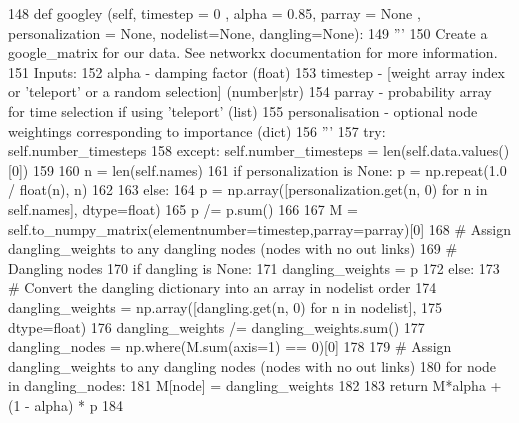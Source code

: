 \begin{DoxyCode}
148       \textcolor{keyword}{def }googley (self, timestep = 0 , alpha = 0.85, parray = None , personalization = None, 
      nodelist=None, dangling=None):
149             \textcolor{stringliteral}{''' }
150 \textcolor{stringliteral}{            Create a google\_matrix for our data. See networkx documentation for more information. }
151 \textcolor{stringliteral}{              Inputs: }
152 \textcolor{stringliteral}{                alpha - damping factor (float)}
153 \textcolor{stringliteral}{                timestep - [weight array index or 'teleport' or a random selection] (number|str)}
154 \textcolor{stringliteral}{                parray - probability array for time selection if using 'teleport' (list)}
155 \textcolor{stringliteral}{                personalisation - optional node weightings corresponding to importance (dict)}
156 \textcolor{stringliteral}{                '''}
157             \textcolor{keywordflow}{try}: self.number\_timesteps
158             \textcolor{keywordflow}{except}: self.number\_timesteps = len(self.data.values()[0])
159                
160             n = len(self.names)
161             \textcolor{keywordflow}{if} personalization \textcolor{keywordflow}{is} \textcolor{keywordtype}{None}:  p = np.repeat(1.0 / float(n), n)
162             
163             \textcolor{keywordflow}{else}:
164                   p = np.array([personalization.get(n, 0) \textcolor{keywordflow}{for} n \textcolor{keywordflow}{in} self.names], dtype=float)
165                   p /= p.sum()
166             
167             M = self.to\_numpy\_matrix(elementnumber=timestep,parray=parray)[0]
168             \textcolor{comment}{# Assign dangling\_weights to any dangling nodes (nodes with no out links)}
169             \textcolor{comment}{# Dangling nodes}
170             \textcolor{keywordflow}{if} dangling \textcolor{keywordflow}{is} \textcolor{keywordtype}{None}:
171                 dangling\_weights = p
172             \textcolor{keywordflow}{else}:
173                 \textcolor{comment}{# Convert the dangling dictionary into an array in nodelist order}
174                 dangling\_weights = np.array([dangling.get(n, 0) \textcolor{keywordflow}{for} n \textcolor{keywordflow}{in} nodelist],
175                                             dtype=float)
176                 dangling\_weights /= dangling\_weights.sum()
177             dangling\_nodes = np.where(M.sum(axis=1) == 0)[0]
178 
179             \textcolor{comment}{# Assign dangling\_weights to any dangling nodes (nodes with no out links)}
180             \textcolor{keywordflow}{for} node \textcolor{keywordflow}{in} dangling\_nodes:
181                 M[node] = dangling\_weights
182                 
183             \textcolor{keywordflow}{return} M*alpha + (1 - alpha) * p
184 
\end{DoxyCode}
\mbox{\label{classSTPR_1_1Sparse3D_a1254a87d6986bbfb8e86270bde3856b6}} 
